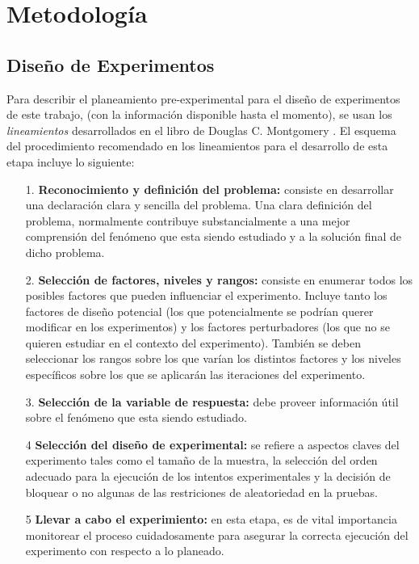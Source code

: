 \section{\textbf{Metodolog\'ia}}
\subsection{Dise\~no de Experimentos}
Para describir el planeamiento pre-experimental para el dise\~no de experimentos de este trabajo, (con la informaci\'on disponible hasta el momento), se usan los \textit{lineamientos} desarrollados en el libro de Douglas C. Montgomery \cite{montgomeryx}. El esquema del procedimiento recomendado en los lineamientos para el desarrollo de esta etapa incluye lo siguiente:
\begin{itemize}
\item [1.] \textbf{Reconocimiento y definici\'on del problema:} consiste en desarrollar una declaraci\'on clara y sencilla del problema. Una clara definici\'on del problema, normalmente contribuye substancialmente a una mejor comprensi\'on del fen\'omeno que esta siendo estudiado y a la soluci\'on final de dicho problema.
\item [2.] \textbf{Selecci\'on de factores, niveles y rangos:} consiste en enumerar todos los posibles factores que pueden influenciar el experimento. Incluye tanto los factores de dise\~no potencial (los que potencialmente se podr\'ian querer modificar en los experimentos) y los factores perturbadores (los que no se quieren estudiar en el contexto del experimento). Tambi\'en se deben seleccionar los rangos sobre los que var\'ian los distintos factores y los niveles espec\'ificos sobre los que se aplicar\'an las iteraciones del experimento.
\item [3.] \textbf{Selecci\'on de la variable de respuesta:} debe proveer informaci\'on \'util sobre el fen\'omeno que esta siendo estudiado.
\item [4] \textbf{Selecci\'on del dise\~no de experimental:} se refiere a aspectos claves del experimento tales como el tama\~no de la muestra, la selecci\'on del orden adecuado para la ejecuci\'on de los intentos experimentales y la decisi\'on de bloquear o no algunas de las restriciones de aleatoriedad en la pruebas.
\item [5] \textbf{Llevar a cabo el experimiento:} en esta etapa, es de vital importancia monitorear el proceso cuidadosamente para asegurar la correcta ejecuci\'on del experimento con respecto a lo planeado.
\end{itemize}
